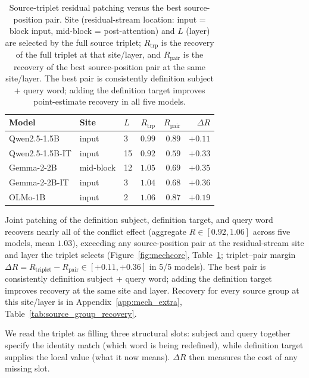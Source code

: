 \documentclass[11pt]{article}
\begin{document}
\begin{table}[t]
\centering
\scriptsize
\setlength{\tabcolsep}{3pt}
\begin{tabular*}{\columnwidth}{@{\extracolsep{\fill}}lllrrr@{}}
\toprule
Model & Site & $L$ & $R_{\text{trp}}$ & $R_{\text{pair}}$ & $\Delta R$ \\
\midrule
Qwen2.5-1.5B    & input     & 3  & $0.99$ & $0.89$ & $+0.11$ \\
Qwen2.5-1.5B-IT & input     & 15 & $0.92$ & $0.59$ & $+0.33$ \\
Gemma-2-2B      & mid-block & 12 & $1.05$ & $0.69$ & $+0.35$ \\
Gemma-2-2B-IT   & input     & 3  & $1.04$ & $0.68$ & $+0.36$ \\
OLMo-1B         & input     & 2  & $1.06$ & $0.87$ & $+0.19$ \\
\bottomrule
\end{tabular*}
\caption{Source-triplet residual patching versus the best source-position pair. Site
(residual-stream location: input = block input, mid-block = post-attention) and $L$ (layer)
are selected by the full source triplet; $R_{\text{trp}}$ is the recovery of the full triplet
at that site/layer, and $R_{\text{pair}}$ is the recovery of the best source-position pair at
the same site/layer. The best pair is consistently definition subject + query word; adding
the definition target improves point-estimate recovery in all five models.}
\label{tab:mechsummary}
\end{table}

Joint patching of the definition subject, definition target, and query word recovers nearly
all of the conflict effect (aggregate $R \in [0.92, 1.06]$ across five models, mean $1.03$),
exceeding any source-position pair at the residual-stream site and layer the triplet selects
(Figure~\ref{fig:mechcore}, Table~\ref{tab:mechsummary}; triplet--pair margin
$\Delta R = R_{\text{triplet}} - R_{\text{pair}} \in [+0.11, +0.36]$ in 5/5 models). The
best pair is consistently definition subject + query word; adding the definition target
improves recovery at the same site and layer. Recovery for every source
group at this site/layer is in Appendix~\ref{app:mech_extra},
Table~\ref{tab:source_group_recovery}.

We read the triplet as filling three structural slots: subject and query together specify the
identity match (which word is being redefined), while definition target supplies the local
value (what it now means). $\Delta R$ then measures the cost of any missing slot.
\end{document}
